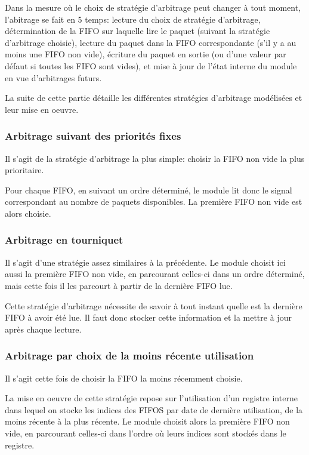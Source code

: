 \documentclass[11pt]{article}
\begin{document}
Dans la mesure où le choix de stratégie d'arbitrage peut changer à tout moment,
l'abitrage se fait en 5 temps:
lecture du choix de stratégie d'arbitrage,
détermination de la FIFO sur laquelle lire le paquet (suivant la stratégie d'arbitrage choisie),
lecture du paquet dans la FIFO correspondante (s'il y a au moins une FIFO non vide),
écriture du paquet en sortie (ou d'une valeur par défaut si toutes les FIFO sont vides),
et mise à jour de l'état interne du module en vue d'arbitrages futurs.

La suite de cette partie détaille les différentes stratégies d'arbitrage modélisées et leur mise en oeuvre.

\subsubsection{Arbitrage suivant des priorités fixes}
Il s'agit de la stratégie d'arbitrage la plus simple: choisir la FIFO non vide la plus prioritaire.

Pour chaque FIFO, en suivant un ordre déterminé, le module lit donc le signal correspondant au nombre
de paquets disponibles.
La première FIFO non vide est alors choisie.

\subsubsection{Arbitrage en tourniquet}
Il s'agit d'une stratégie assez similaires à la précédente.
Le module choisit ici aussi la première FIFO non vide, en parcourant celles-ci dans un ordre déterminé,
mais cette fois il les parcourt à partir de la dernière FIFO lue.

Cette stratégie d'arbitrage nécessite de savoir à tout instant quelle est la dernière FIFO à avoir
été lue.
Il faut donc stocker cette information et la mettre à jour après chaque lecture.

\subsubsection{Arbitrage par choix de la moins récente utilisation}
Il s'agit cette fois de choisir la FIFO la moins récemment choisie.

La mise en oeuvre de cette stratégie repose sur l'utilisation d'un registre interne
dans lequel on stocke les indices des FIFOS par date de dernière utilisation, de la moins récente à la plus récente.
Le module  choisit alors la première FIFO non vide, en parcourant celles-ci dans l'ordre où leurs indices sont stockés
dans le registre.
\end{document}
